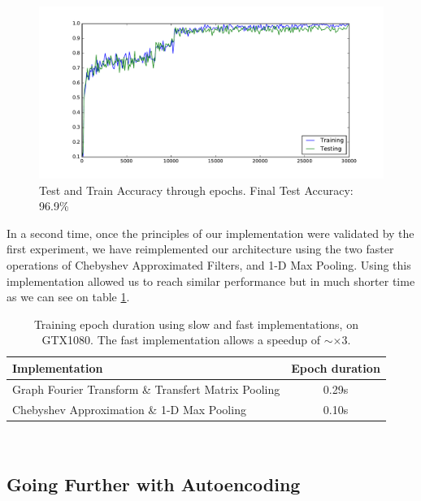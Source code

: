 \begin{figure}
    \centering
    \includegraphics[width=\textwidth]{img/training_curve.pdf}
    \caption{Test and Train Accuracy through epochs. Final Test Accuracy: 96.9\%}
    \label{fig:training_curve}
\end{figure}

In a second time, once the principles of our implementation were validated by the first experiment, we have reimplemented our architecture using the two faster operations of Chebyshev Approximated Filters, and 1-D Max Pooling. Using this implementation allowed us to reach similar performance but in much shorter time as we can see on table \ref{tab:slow_fast}.

\begin{table}[]
    \centering
    \begin{tabular}{|l|c|}
        \hline
         Implementation & Epoch duration \\ \hline
         Graph Fourier Transform \& Transfert Matrix Pooling & 0.29s \\
         Chebyshev Approximation \& 1-D Max Pooling & 0.10s \\ \hline
    \end{tabular}
    \\
    \caption{Training epoch duration using slow and fast implementations, on GTX1080. The fast implementation allows a speedup of $\sim \times 3$.}
    \label{tab:slow_fast}
\end{table}


\subsection{Going Further with Autoencoding}

